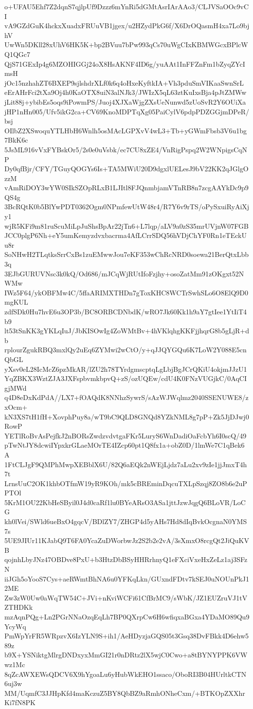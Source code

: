 o+UFAU5Ehf7Z2dqnS7qjlpUf9Dzzz6mYnRi5dGMtAsrIArAAo3/CLJVSaOOc9vCI
vA9GZdGuK4hckxXuadxFRUuVB1jgex/u2HZydPkG6f/X6DrOQasmH4xa7Lo9bjhV
UwWn5DKll28xUhV6HK5K+bp2BVuu7bPw993qCs70uWgCIxKBMWGcxBPlcWQ1QGc7
QjS71GExIp4g6MZOHIGGj24oX8HsAKNF4ID6g/yuAAt1InFFZnFm1bZyqZYcImsH
jOc15nzhahZT6BXEP9sjlshdrXLf0k6q4oHxeKyftkIA+Vh3pduSmVIKaaSwnSrL
eErAHrFci2tXa9Oj4h0KaOTX8uiN3alNJk3/JWIzX5qL63ztKuIxsBja4pJtZMWw
jLit88j+ybibEs5oqs9iPowmPS/Juoj4XJXaWjgZXsUeNunwd5zUoSvR2Y6OUiXa
jHP1nHn005/Ufv5ikG2ca+CV69KnoMDPTqXg05PaiCylV6pdpPDZGGjmDPeR/bsj
OIlbZ2XSwoquYTLHbH6Wnlh5osMAcLGPXvV4wL3+Tb+yGWmFbsb3V6u1bg7BkK6c
5JsML916vVxFYBskOr5/2s0e0uVsbk/ec7CU8xZE4/VnRigPspq2W2WNpigsCqNP
Dy0qfBjr/CFY/TGuyQOGYs6Is+TA5MWiU20D9dgxlUELesJ9bV22KK2qJGlgOzzM
vAmRiDOY3wYW0SIkSZOpRLxB1LJItl8FJQnmbjamVTnRB8n7zcgAAYkDc9p9QS4g
3BcRQtK0b5BlYwPDT0362Ogm0NPmfewUtW48r4/R7Y6v9rTS/oPySxuiRyAiXjy1
wjR5KFi9m81ruScuMiLpJuShsBpAr22jTn6+L7lqp/aLV9a0zS35mrUVjnW07FGB
JCC0plgP6Nh+eY5umKemyzdvxbacrma4AfLCrrSDQ56hVDjChYF0Rn1eTEckUu8r
SoNHwH2TLqtksSrrCxBs1zuEMwwJou7eKF353wChRcNRD0soewa21BerQtxLbb3q
3EJbGURUVNsc3k0kQ/Od686/mJCqWjRUtIfoFzjhy+osoZatMm91zOKgxt52NWMw
IWz5F64/ykOBFMw4C/5ffaARIMXTHDn7gToxKHC8WCTrSwhSLo6O8ElQ9D0mgKUL
zdfSDk0Hu7hvE6u3OP3b/BC8ORBCDNbdK/wRO7Jk60Kk1h9aY7gtIee1YtIiT4b9
lt53tSnKK3gYKLqIuJ/JbKISOwIg4ZoWMtBv+4hVKlqhgKKFjjhqrG8b5gLjR+db
rplourZgukRBQ3mxlQy2uEq6ZYMwi2wCtO/y+qJJQYGQu6K7LoW2Y088E5cnQbGL
yXsv0eL28IcMcZ6pzMkAR/lZU2h78TYrdgmscptqLgLbjBgJCrQKiU4okjmJJzU1
YqZBKX3WztZJA3JXFspbvmkbpvQ+zS/ozUQEw/cdU4K0FNzVUGjkC/0AqCIgjMWd
q4D8eDxKdPdA//LX7+fOAQdK8NNhzSywrS/sAzWJWqlmz2040SSENUWE8/zxOcm+
kN3XS7tH1fH+XovphPuy8a/wT9bC9QLD8GNQd8YZkNML8g7pP+Zk5JjDJwj0RowP
YETlRoBvAsPejfkJ2nBORsZwdzvdvtgaFKr5LuryS6WnDadiOaFcbYh6I0scQ/49
pTwNtJY8dcwiIYpxkrGLaeMOrTE4IZcp60pt1Q8fx1a+obZ0D/1lmWe7C1qBek6A
1FtCLJgF9QMPhMwpXEBblX6U/82Q6aEQk2nWEjLjdz7aLu2xv9zIe1jjJmxT4h7t
LrnsUuC2OK1khbOTfmW19yR9KOh/mk5cBREminDqcuTXLpSzqj8ZO8b6e2uPPTOl
5KrM1OU22KbHeSByil0J4d0caRf1lu0BYeARsO3ASa1jttJzwJqgQ6BLoVR/LoCG
kh0lVei/SWld6ueBxO4gqcV/BDlZY7/ZHGP4d5yAHs7Hd8dIqBvkOcgnaN0YMS7s
5UE9JIUr11KJabQ9T6FA0YcaZuDWorbwJz2S2b2e2vA/3sXmxO8rcgQt2JiQuKVB
qojnhLbyJNz47OBDve8PxU+b3HtzDbBSyHHRrhnyQ1eFXciVxeHxZeLz1aj3SFzN
iiJGh5oYooS7Cys+aeRWmtBhNA6u0YFKqLkn/GUxndFDtv7kSEJ0uNOUnPkJ12ME
Zw3zW0Uw0aWqTW54C+JVi+nKviWCFi61CfBrMC9/sWbK/JZ1EUZruVJ1tVZTHDKk
mzAqnPQg+Ln2PGrNNaOzqEqLh7BP0QXrpCw6H6wfiqxaBGxa4YDaMO89Qu9YcyWq
PmWpYrFR5WRpzvX6IzYLN9S+ih1/AeHDyzjaGQS05t3Gsq38DvFBkk4D6ehw589z
b9X+YSNiktgMlrgDNDxyxMmGI21r0nDRtz2lX5wjC0Cwo+a8tBYNYPPK6VWwz1Mc
8qZcAWXEWsQDCV6X9hYgoaLu6yHubWkEHO1ssaco/OboRI3B04HUrltkCTN6uj3w
MM/UqmfC3JJHpKfd4maKczuZ5BY8QbBZ9aRmhONheCxm/+BTKOpZXXhrKi7fN8PK
